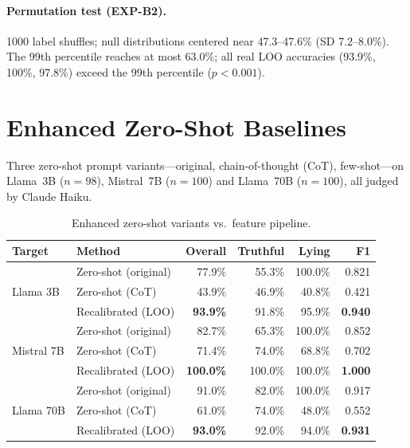 \paragraph{Permutation test (EXP-B2).}
1000 label shuffles; null distributions centered near 47.3--47.6\% (SD 7.2--8.0\%). The 99th percentile reaches at most 63.0\%; all real LOO accuracies (93.9\%, 100\%, 97.8\%) exceed the 99th percentile ($p<0.001$).

\section{Enhanced Zero-Shot Baselines}
\label{app:zero_shot}
\label{sec:zero_shot}

Three zero-shot prompt variants---original, chain-of-thought (CoT), few-shot---on Llama~3B ($n=98$), Mistral~7B ($n=100$) and Llama~70B ($n=100$), all judged by Claude Haiku.

\begin{table}[h]
\centering
\caption{Enhanced zero-shot variants vs.\ feature pipeline.}
\label{tab:zero_shot_comparison}
\begin{tabular}{llrrrr}
\toprule
\textbf{Target} & \textbf{Method} & \textbf{Overall} & \textbf{Truthful} & \textbf{Lying} & \textbf{F1} \\
\midrule
\multirow{3}{*}{Llama 3B}
  & Zero-shot (original)  & 77.9\% & 55.3\% & 100.0\% & 0.821 \\
  & Zero-shot (CoT)       & 43.9\% & 46.9\% & 40.8\%  & 0.421 \\
  & Recalibrated (LOO)    & \textbf{93.9\%} & 91.8\% & 95.9\%  & \textbf{0.940} \\
\midrule
\multirow{3}{*}{Mistral 7B}
  & Zero-shot (original)  & 82.7\% & 65.3\% & 100.0\% & 0.852 \\
  & Zero-shot (CoT)       & 71.4\% & 74.0\% & 68.8\%  & 0.702 \\
  & Recalibrated (LOO)    & \textbf{100.0\%} & 100.0\% & 100.0\% & \textbf{1.000} \\
\midrule
\multirow{3}{*}{Llama 70B}
  & Zero-shot (original)  & 91.0\% & 82.0\% & 100.0\% & 0.917 \\
  & Zero-shot (CoT)       & 61.0\% & 74.0\% & 48.0\%  & 0.552 \\
  & Recalibrated (LOO)    & \textbf{93.0\%} & 92.0\% & 94.0\%  & \textbf{0.931} \\
\bottomrule
\end{tabular}
\end{table}

